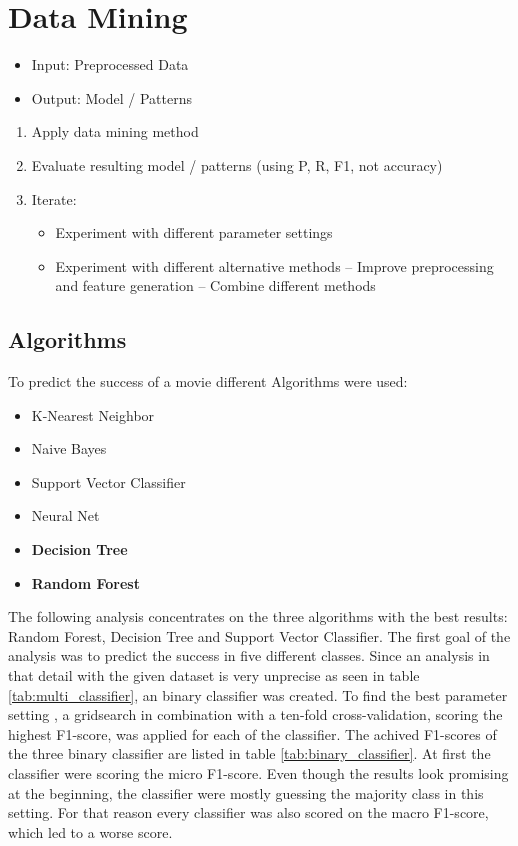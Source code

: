 \chapter{Data Mining}
\label{cha:data_mining}
\begin{itemize}
	\item Input: Preprocessed Data
	\item Output: Model / Patterns
\end{itemize}

\begin{enumerate}
	\item Apply data mining method
	\item Evaluate resulting model / patterns (using P, R, F1, not accuracy)
	\item Iterate:
	\begin{itemize}
		\item Experiment with different parameter settings
		\item Experiment with different alternative methods – Improve preprocessing and feature generation – Combine different methods
	\end{itemize}
\end{enumerate}

\section{Algorithms}
To predict the success of a movie different Algorithms were used:
\begin{itemize}
	\item K-Nearest Neighbor
	\item Naive Bayes
	\item Support Vector Classifier
	\item Neural Net
	\item \textbf{Decision Tree}
	\item \textbf{Random Forest}
\end{itemize}

The following analysis concentrates on the three algorithms with the best results: Random Forest, Decision Tree and Support Vector Classifier.
The first goal of the analysis was to predict the success in five different classes. Since an analysis in that detail with the given dataset is very unprecise as seen in table \ref{tab:multi_classifier}, an binary classifier was created. To find the best parameter setting , a gridsearch in combination with a ten-fold cross-validation, scoring the highest F1-score, was applied for each of the classifier.
The achived F1-scores of the three binary classifier are listed in table \ref{tab:binary_classifier}. At first the classifier were scoring the micro F1-score. Even though the results look promising at the beginning, the classifier were mostly guessing the majority class in this setting. For that reason every classifier was also scored on the macro F1-score, which led to a worse score.


